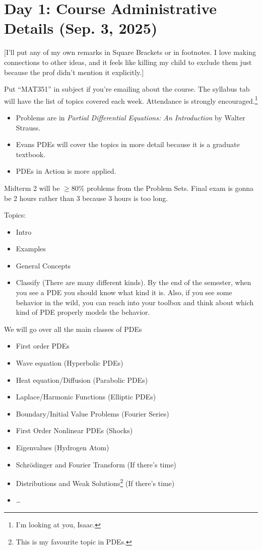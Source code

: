 \section{Day 1: Course Administrative Details (Sep. 3, 2025)}
[I'll put any of my own remarks in Square Brackets or in footnotes. I love making connections to other ideas, and it feels like killing my child to exclude them just because the prof didn't mention it explicitly.]

Put ``MAT351'' in subject if you're emailing about the course. The syllabus tab will have the list of topics covered each week. Attendance is strongly encouraged.\footnote{I'm looking at you, Isaac.} 

\begin{itemize}

	\item Problems are in \textit{Partial Differential Equations: An Introduction} by Walter Strauss. 
	\item Evans PDEs will cover the topics in more detail because it is a graduate textbook. 
	\item PDEs in Action is more applied.

\end{itemize}

Midterm 2 will be \( \ge \)80\% problems from the Problem Sets. Final exam is gonna be 2 hours rather than 3 because 3 hours is too long.

Topics:
\begin{itemize}

	\item Intro
	\item Examples
	\item General Concepts
	\item Classify (There are many different kinds). By the end of the semester, when you see a PDE you should know what kind it is. Also, if you see some behavior in the wild, you can reach into your toolbox and think about which kind of PDE properly models the behavior.

\end{itemize}

We will go over all the main classes of PDEs
\begin{itemize}

	\item First order PDEs
	\item Wave equation (Hyperbolic PDEs)
	\item Heat equation/Diffusion (Parabolic PDEs)
	\item Laplace/Harmonic Functions (Elliptic PDEs)
	\item Boundary/Initial Value Problems (Fourier Series)
	\item First Order Nonlinear PDEs (Shocks)
	\item Eigenvalues (Hydrogen Atom) 
	\item Schr\"odinger and Fourier Transform (If there's time)
	\item Distributions and Weak Solutions\footnote{This is my favourite topic in PDEs.} (If there's time)
	\item \ldots

\end{itemize}

